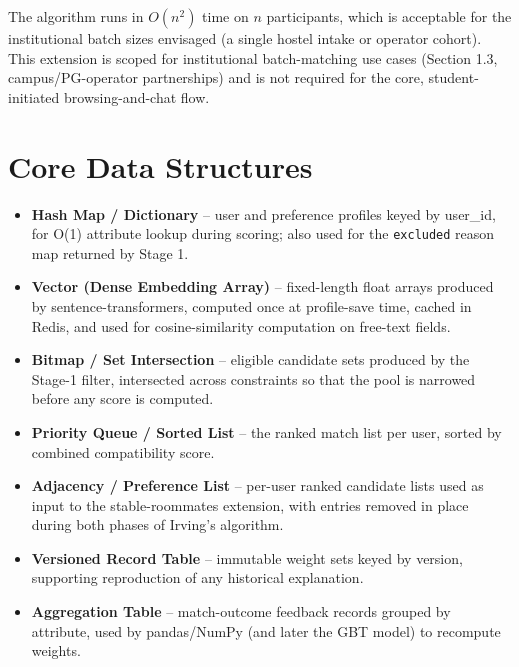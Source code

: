 \documentclass[12pt,a4paper]{report}
\begin{document}
\vspace{4mm}

The algorithm runs in $O(n^{2})$ time on $n$ participants, which is acceptable for the institutional batch sizes envisaged (a single hostel intake or operator cohort). This extension is scoped for institutional batch-matching use cases (Section 1.3, campus/PG-operator partnerships) and is not required for the core, student-initiated browsing-and-chat flow.

\section{Core Data Structures}

\begin{itemize}[noitemsep]
    \vspace{10px}
    \item \textbf{Hash Map / Dictionary} -- user and preference profiles keyed by user\_id, for O(1) attribute lookup during scoring; also used for the \texttt{excluded} reason map returned by Stage 1.
    \vspace{10px}
    \item \textbf{Vector (Dense Embedding Array)} -- fixed-length float arrays produced by sentence-transformers, computed once at profile-save time, cached in Redis, and used for cosine-similarity computation on free-text fields.
    \vspace{10px}
    \item \textbf{Bitmap / Set Intersection} -- eligible candidate sets produced by the Stage-1 filter, intersected across constraints so that the pool is narrowed before any score is computed.
    \vspace{10px}
    \item \textbf{Priority Queue / Sorted List} -- the ranked match list per user, sorted by combined compatibility score.
    \vspace{10px}
    \item \textbf{Adjacency / Preference List} -- per-user ranked candidate lists used as input to the stable-roommates extension, with entries removed in place during both phases of Irving's algorithm.
    \vspace{10px}
    \item \textbf{Versioned Record Table} -- immutable weight sets keyed by version, supporting reproduction of any historical explanation.
    \vspace{10px}
    \item \textbf{Aggregation Table} -- match-outcome feedback records grouped by attribute, used by pandas/NumPy (and later the GBT model) to recompute weights.
\end{itemize}
\end{document}
